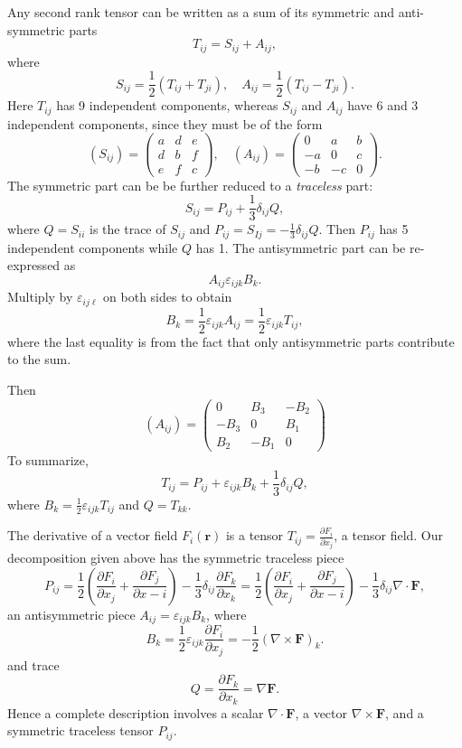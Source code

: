 \documentclass[a4paper]{article}
\begin{document}
Any second rank tensor can be written as a sum of its symmetric and anti-symmetric parts
\[
  T_{ij} = S_{ij} + A_{ij},
\]
where
\[
  S_{ij} = \frac{1}{2}(T_{ij} + T_{ji}),\quad A_{ij} = \frac{1}{2}(T_{ij} - T_{ji}).
\]
Here $T_{ij}$ has 9 independent components, whereas $S_{ij}$ and $A_{ij}$ have 6 and 3 independent components, since they must be of the form
\[
  (S_{ij}) = 
  \begin{pmatrix}
    a & d & e\\
    d & b & f\\
    e & f & c
  \end{pmatrix}
  ,\quad
  (A_{ij}) = 
  \begin{pmatrix}
    0 & a & b\\
    -a & 0 & c\\
    -b & -c & 0
  \end{pmatrix}.
\]
The symmetric part can be be further reduced to a \emph{traceless} part:
\[
  S_{ij} = P_{ij} + \frac{1}{3}\delta_{ij} Q,
\]
where $Q = S_{ii}$ is the trace of $S_{ij}$ and $P_{ij} = S_{Ij} = -\frac{1}{3}\delta_{ij}Q$. Then $P_{ij}$ has 5 independent components while $Q$ has 1. The antisymmetric part can be re-expressed as
\[
  A_{ij}\varepsilon_{ijk}B_k.
\]
Multiply by $\varepsilon_{ij\ell}$ on both sides to obtain
\[
  B_k = \frac{1}{2}\varepsilon_{ijk}A_{ij} = \frac{1}{2}\varepsilon_{ijk}T_{ij},
\]
where the last equality is from the fact that only antisymmetric parts contribute to the sum.

Then
\[
  (A_{ij}) = 
  \begin{pmatrix}
    0 & B_3 & -B_2\\
    -B_3 & 0 & B_1\\
    B_2 & -B_1 & 0
  \end{pmatrix}
\]
To summarize,
\[
  T_{ij} = P_{ij} + \varepsilon_{ijk}B_k + \frac{1}{3}\delta_{ij}Q,
\]
where $B_k = \frac{1}{2}\varepsilon_{ijk} T_{ij}$ and $Q = T_{kk}$.

\begin{eg}
  The derivative of a vector field $F_i (\mathbf{r})$ is a tensor $T_{ij} = \frac{\partial F_i}{\partial x_j}$, a tensor field. Our decomposition given above has the symmetric traceless piece
  \[
    P_{ij} = \frac{1}{2}\left(\frac{\partial F_i}{\partial x_j} + \frac{\partial F_j}{\partial x-i}\right) - \frac{1}{3}\delta_{ij}\frac{\partial F_k}{\partial x_k} = \frac{1}{2}\left(\frac{\partial F_i}{\partial x_j} + \frac{\partial F_j}{\partial x-i}\right) - \frac{1}{3}\delta_{ij}\nabla\cdot \mathbf{F},
  \]
  an antisymmetric piece $A_{ij} = \varepsilon_{ijk}B_k$, where 
  \[
    B_k = \frac{1}{2}\varepsilon_{ijk}\frac{\partial F_i}{\partial x_j} = -\frac{1}{2}(\nabla\times \mathbf{F})_k.
  \]
  and trace
  \[
    Q = \frac{\partial F_k}{\partial x_k} = \nabla \mathbf{F}.
  \]
  Hence a complete description involves a scalar $\nabla\cdot \mathbf{F}$, a vector $\nabla\times \mathbf{F}$, and a symmetric traceless tensor $P_{ij}$.
\end{eg}
\end{document}
